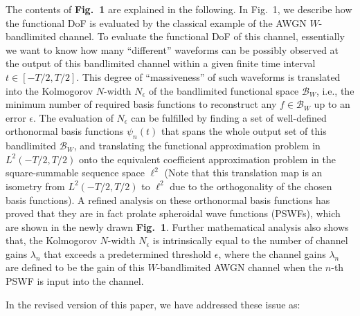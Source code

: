 \documentclass[a4paper,12pt]{article}
\begin{document}
{    \quad The contents of {\bf Fig.~1} are explained in the following. In Fig.~1, we describe how the functional DoF is evaluated by the classical example of the AWGN $W$-bandlimited channel. To evaluate the functional DoF of this channel, essentially we want to know how many ``different'' waveforms can be possibly observed at the output of this bandlimited channel within a given finite time interval $t\in[-T/2, T/2]$. 
    This degree of ``massiveness'' of such waveforms is translated into the Kolmogorov $N$-width $N_\epsilon$ of the bandlimited functional space ${\mathcal{B}_W}$, i.e., the minimum number of required basis functions to reconstruct any $f\in\mathcal{B}_W$ up to an error $\epsilon$.  
    The evaluation of $N_\epsilon$ can be fulfilled by finding a set of well-defined orthonormal basis functions $\psi_n(t)$ that spans the whole output set of this bandlimited $\mathcal{B}_W$, and translating the functional approximation problem in $L^2(-T/2, T/2)$ onto the equivalent coefficient approximation problem in the square-summable sequence space $\ell^2$ (Note that this translation map is an isometry from $L^2(-T/2, T/2)$ to $\ell^2$ due to the orthogonality of the chosen basis functions). A refined analysis on these orthonormal basis functions has proved that they are in fact prolate spheroidal wave functions (PSWFs), which are shown in the newly drawn {\bf Fig.~1}. Further mathematical analysis also shows that, the Kolmogorov $N$-width $N_\epsilon$ is intrinsically equal to the number of channel gains $\lambda_n$ that exceeds a predetermined threshold $\epsilon$, where the channel gains $\lambda_n$ are defined to be the gain of this $W$-bandlimited AWGN channel when the $n$-th PSWF is input into the channel. 


    In the revised version of this paper, we have addressed these issue as:

}
\end{document}

